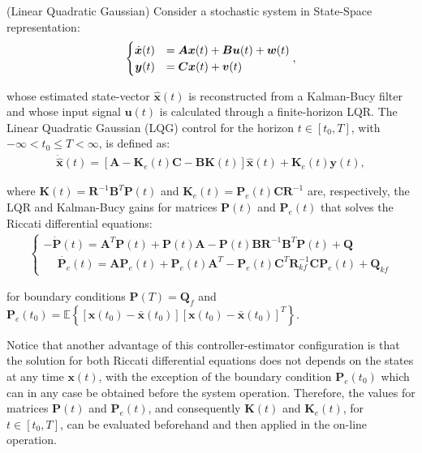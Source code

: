 \documentclass[a4paper,11pt]{book}
\numberwithin{figure}{chapter}
\numberwithin{equation}{chapter}
\numberwithin{table}{chapter}
\theoremstyle{definition}
\newtheorem{definition}{Definition}[chapter]
\newcounter{boxed-theorem}
\newcounter{boxed-definition}
\newenvironment{boxed-definition}[1]
{\begin{shaded} \begin{definition}{#1}}
{\end{definition} \end{shaded}}
\begin{document}
\begin{boxed-definition}{(Linear Quadratic Gaussian)} \label{def:lqg}
    Consider a stochastic system in State-Space representation:
	\begin{align}
    \begin{cases}
        \hfill \dot{\bm{x}}(t) &= \bm{A} \bm{x}(t) + \bm{B} \bm{u}(t) + \bm{w}(t) \\
        \hfill \bm{y}(t) &= \bm{C} \bm{x}(t) + \bm{v}(t)
    \end{cases}
    ,\end{align}
    
     \noindent whose estimated state-vector $\hat{\bm{x}}(t)$ is reconstructed from a Kalman-Bucy filter and whose input signal $\bm{u}(t)$ is calculated through a finite-horizon LQR. The Linear Quadratic Gaussian (LQG) control for the horizon $t \in [t_0, T]$, with $-\infty < t_0 \leq T < \infty$, is defined as:
    \begin{align} \label{eq:lqg01}
        \dot{\hat{\bm{x}}}(t) = \left[\bm{A} - \bm{K}_e(t) \bm{C} - \bm{B} \bm{K}(t) \right] \hat{\bm{x}}(t) + \bm{K}_e(t) \bm{y}(t) 
    ,\end{align}
    
    \noindent where $\bm{K}(t) = \bm{R}^{-1}\bm{B}^T \bm{P}(t)$ and $\bm{K}_e(t) = \bm{P}_e(t) \bm{C} \bm{R}^{-1}$ are, respectively, the LQR and Kalman-Bucy gains for matrices $\bm{P}(t)$ and $\bm{P}_e(t)$ that solves the Riccati differential equations:
    \begin{align}
    \begin{cases}
        -\dot{\bm{P}}(t) = \bm{A}^T \bm{P}(t) + \bm{P}(t) \bm{A} - \bm{P}(t) \bm{B} \bm{R}^{-1} \bm{B}^T \bm{P}(t) + \bm{Q} \\
        \phantom{-} \dot{\bm{P}_e}(t) = \bm{A} \bm{P}_e(t) + \bm{P}_e(t) \bm{A}^T - \bm{P}_e(t)\bm{C}^T\bm{R}_{kf}^{-1} \bm{C} \bm{P}_e(t) + \bm{Q}_{kf}
    \end{cases}
    \end{align}
    
    \noindent for boundary conditions $\bm{P}(T) = \bm{Q}_f$ and $\bm{P}_e(t_0) = \mathbb{E} \left\{ [\bm{x}(t_0) - \bar{\bm{x}}(t_0)][\bm{x}(t_0) - \bar{\bm{x}}(t_0)]^T \right\}$.
\end{boxed-definition}

Notice that another advantage of this controller-estimator configuration is that the solution for both Riccati differential equations does not depends on the states at any time $\bm{x}(t)$, with the exception of the boundary condition $\bm{P}_e(t_0)$ which can in any case be obtained before the system operation. Therefore, the values for matrices $\bm{P}(t)$ and $\bm{P}_e(t)$, and consequently $\bm{K}(t)$ and $\bm{K}_e(t)$, for $t \in [t_0, T]$, can be evaluated beforehand and then applied in the on-line operation.
\end{document}
